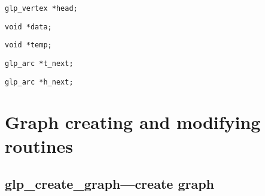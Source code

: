 \documentclass[dvipdfm,11pt]{report}
\begin{document}
\medskip

\noindent
\verb|glp_vertex *head;|

\begin{comment}Pointer to a vertex, which is head endpoint of the arc.
\end{comment}

\medskip

\noindent
\verb|void *data;|

\begin{comment}Pointer to a data block associated with the arc. This
data block is automatically allocated on creating a new arc and freed on
deleting the arc. If $v\_size=0$, the block is not allocated, and this
field contains \verb|NULL|.
\end{comment}

\medskip

\noindent
\verb|void *temp;|

\begin{comment}Working pointer, which may be used freely for any
purposes. The application program can change this field directly.
\end{comment}

\medskip

\noindent
\verb|glp_arc *t_next;|

\begin{comment}Pointer to another arc, which has the same tail endpoint
as this one. \verb|NULL| in this field indicates the end of the list of
outgoing arcs.
\end{comment}

\medskip

\noindent
\verb|glp_arc *h_next;|

\begin{comment}Pointer to another arc, which has the same head endpoint
as this one. \verb|NULL| in this field indicates the end of the list of
incoming arcs.
\end{comment}


\newpage

\section{Graph creating and modifying routines}

\subsection{glp\_create\_graph---create graph}
\end{document}
